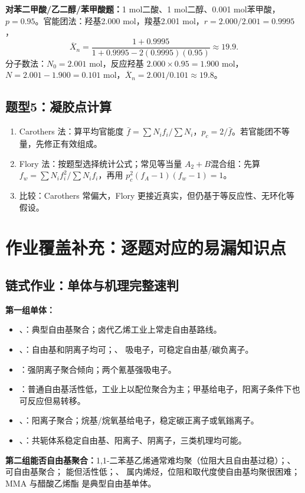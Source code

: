 \documentclass[UTF8,a4paper,10pt,twocolumn]{ctexart}
\newcommand{\Xn}{\overline{X}_n}
\begin{document}
\begin{examplebox}
  \textbf{对苯二甲酸/乙二醇/苯甲酸题：}1 mol二酸、1 mol二醇、0.001 mol苯甲酸，$p=0.95$。官能团法：羟基2.000 mol，羧基2.001 mol，$r=2.000/2.001=0.9995$，
  \[
    \Xn=\frac{1+0.9995}{1+0.9995-2(0.9995)(0.95)}\approx19.9.
  \]
  分子数法：$N_0=2.001$ mol，反应羟基 $2.000\times0.95=1.900$ mol，$N=2.001-1.900=0.101$ mol，$\Xn=2.001/0.101\approx19.8$。
\end{examplebox}

\subsection{题型5：凝胶点计算}
\begin{enumerate}
  \item Carothers 法：算平均官能度 $\bar f=\sum N_if_i/\sum N_i$，$p_c=2/\bar f$。若官能团不等量，先修正有效组成。
  \item Flory 法：按题型选择统计公式；常见等当量 $A_2+B$混合组：先算 $f_w=\sum N_if_i^2/\sum N_if_i$，再用 $p_c^2(f_A-1)(f_w-1)=1$。
  \item 比较：Carothers 常偏大，Flory 更接近真实，但仍基于等反应性、无环化等假设。
\end{enumerate}


\section{作业覆盖补充：逐题对应的易漏知识点}
\subsection{链式作业：单体与机理完整速判}
\begin{exam}
\textbf{第一组单体：}
\begin{itemize}
  \item {}、：典型自由基聚合；卤代乙烯工业上常走自由基路线。
  \item {}、：自由基和阴离子均可；、 吸电子，可稳定自由基/碳负离子。
  \item {}：强阴离子聚合倾向；两个氰基强吸电子。
  \item {}：普通自由基活性低，工业上以配位聚合为主；甲基给电子，阳离子条件下也可反应但易转移。
  \item {}、：阳离子聚合；烷基/烷氧基给电子，稳定碳正离子或氧鎓离子。
  \item {}、：共轭体系稳定自由基、阳离子、阴离子，三类机理均可能。
\end{itemize}
\textbf{第二组能否自由基聚合：}1,1-二苯基乙烯通常难均聚（位阻大且自由基过稳）；、 可自由基聚合； 能但活性低；、 属内烯烃，位阻和取代度使自由基均聚很困难；MMA  与醋酸乙烯酯  是典型自由基单体。
\end{exam}
\end{document}
